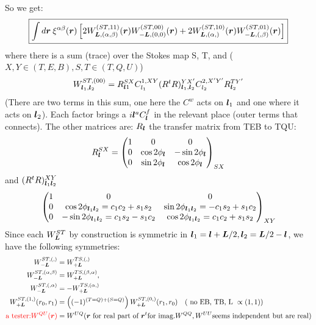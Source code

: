 \documentclass[11pt]{article}
\begin{document}
So we get:
\begin{equation}\boxed{
 \int d\boldsymbol{r} \:	\xi^{\alpha \beta}(\boldsymbol{r}) \left[2W^{(ST, 11)}_{\boldsymbol{L}, (\alpha, \beta)}(\boldsymbol{r})W^{(ST, 00)}_{-\boldsymbol{L},(0,0)}(\boldsymbol{r}) + 2 W^{(ST, 10)}_{\boldsymbol{L}, (\alpha,)}(\boldsymbol{r})W^{(ST, 01)}_{-\boldsymbol{L},(,\beta)}(\boldsymbol{r})\right]}
\end{equation}
where there is a sum (trace) over the Stokes map S, T, and ($X, Y \in (T, E ,B), S, T \in (T, Q, U)$)
\begin{equation}
	W^{ST, (00)}_{\boldsymbol{l}_1,\boldsymbol{l}_2} = R^{SX}_{\boldsymbol{l}1} C^{1, XY}_{l_1} (R^tR)^{YX'}_{\boldsymbol{l}_1,\boldsymbol{l}_2} C_{l_2}^{2, X' Y'} R^{T Y'}_{\boldsymbol{l}_2}
\end{equation}
(There are two terms in this sum, one here the $C^{w}$ acts on $\boldsymbol{l}_1$ and one where it acts on $\boldsymbol{l}_2$). Each factor brings a $i\boldsymbol{l}^a C^{f}_{\boldsymbol{l}}$ in the relevant place (outer terms that connects).
The other matrices are: $R_{\boldsymbol{l}}$ the transfer matrix from TEB to TQU:
\begin{equation} R^{SX}_{\boldsymbol{l}} = 
	\begin{pmatrix}
		1 & 0 & 0 \\ 0 & \cos 2\phi_{\boldsymbol{l}} & -\sin 2\phi_{\boldsymbol{l}} \\ 0 & \sin 2\phi_{\boldsymbol{l}} & \cos 2\phi_{\boldsymbol{l}}
	\end{pmatrix}_{SX}
\end{equation}
and $(R^tR)^{XY}_{\boldsymbol{l}_1\boldsymbol{l}_2}$
\begin{equation}
		\begin{pmatrix}
		1 & 0 & 0 \\ 0 & \cos 2\phi_{\boldsymbol{l}_1\boldsymbol{l}_2}= c_1c_2 + s_1 s_2 & \sin 2\phi_{\boldsymbol{l}_1\boldsymbol{l}_2}= -c_1s_2 + s_1 c_2 \\ 0 & -\sin 2\phi_{\boldsymbol{l}_1\boldsymbol{l}_2}= c_1s_2 - s_1 c_2 & \cos 2\phi_{\boldsymbol{l}_1\boldsymbol{l}_2}= c_1c_2 + s_1 s_2
	\end{pmatrix}_{XY}
\end{equation}
Since each $W_{\boldsymbol{L}}^{ST}$ by construction is symmetric in $\boldsymbol{l}_1 = \boldsymbol{l} + \boldsymbol{L}/2, \boldsymbol{l}_2 = \boldsymbol{L} /2 - \boldsymbol{l}$, we have the following symmetries:
\begin{equation}
\begin{split}
  W_{-\boldsymbol{L}}^{ST, (,)} &= W_{+\boldsymbol{L}}^{TS, (,)}\\
	W_{-\boldsymbol{L}}^{ST, (\alpha,\beta)} &= W_{+\boldsymbol{L}}^{TS, (\beta,\alpha)}, \\
	W_{-\boldsymbol{L}}^{ST, (,\alpha)} &= -W_{+\boldsymbol{L}}^{TS, (\alpha,)} \\
	W_{+\boldsymbol{L}}^{ST, (1,)}(r_0, r_1) &= \left( (-1)^{ (T=Q) + (S = Q)}\right)W_{+\boldsymbol{L}}^{ST, (0,)}(r_1, r_0) \quad (\textrm{ no EB, TB, L }\propto (1,1))\\
	\color{red}
\textrm{a tester:} W^{QU}(\boldsymbol{r}) &= W^{UQ}(\boldsymbol{r} \textrm{ for real part of } \boldsymbol{r}^t \textrm{for imag}. W^{QQ}, W^{UU} \textrm{seems independent but are real})
\color{black}
\end{split}
\end{equation}
\end{document}
